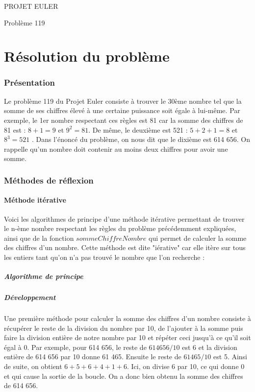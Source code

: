 \documentclass{article}
\begin{document}
\hfill
\hfill
\hfill
\begin{center}
  \large{PROJET EULER}

  Problème 119
\end{center}
\tableofcontents
\newpage
\part {Résolution du problème}
\section {Présentation}

Le problème 119 du Projet Euler consiste à trouver le 30ème nombre tel que la somme de ses chiffres élevé à une certaine puissance soit égale à lui-même. Par exemple, le 1er nombre respectant ces règles est 81 car la somme des chiffres de 81 est : $ 8 + 1 = 9 $ et $ 9^{2} = 81 $. De même, le deuxième est 521 : $ 5 + 2 + 1 = 8 $ et $ 8^{3} = 521 $	. Dans l'énoncé du problème, on nous dit que le dixième est 614 656. On rappelle qu'un nombre doit contenir au moins deux chiffres pour avoir une somme.

\section{Méthodes de réflexion}

\subsection{Méthode itérative}
Voici les algorithmes de principe d'une méthode itérative permettant de trouver le n-ème nombre respectant les règles du problème précédemment expliquées, ainsi que de la fonction $sommeChiffreNombre$ qui permet de calculer la somme des chiffres d'un nombre. Cette méthode est dite "iérative" car elle itère sur tous les entiers tant qu'on n'a pas trouvé le nombre que l'on recherche :
\subsubsection{Algorithme de principe}



\subsubsection{Développement}
Une première méthode pour calculer la somme des chiffres d'un nombre consiste à récupérer le reste de la division du nombre par 10, de l'ajouter à la somme puis faire la division entière de notre nombre par 10 et répéter ceci jusqu'à ce qu'il soit égal à 0. Par exemple, pour 614 656, le reste de $614656/10$ est 6 et la division entière de 614 656 par 10 donne 61 465. Ensuite le reste de $61465/10$ est 5. Ainsi de suite, on obtient $6 + 5 + 6 + 4 + 1 + 6$. Ici, on divise 6 par 10, ce qui donne 0 et qui cause la sortie de la boucle. On a donc bien obtenu la somme des chiffres de 614 656.
\end{document}
